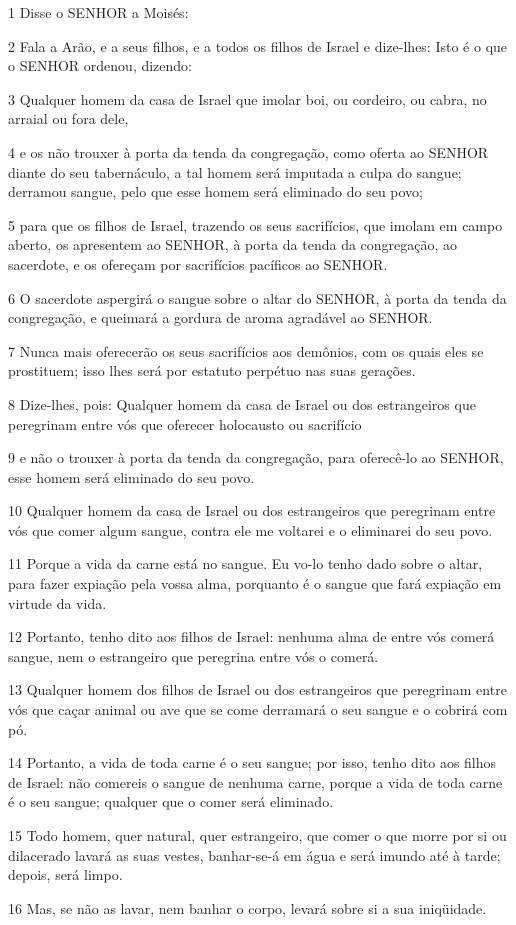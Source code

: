 \par 1 Disse o SENHOR a Moisés:
\par 2 Fala a Arão, e a seus filhos, e a todos os filhos de Israel e dize-lhes: Isto é o que o SENHOR ordenou, dizendo:
\par 3 Qualquer homem da casa de Israel que imolar boi, ou cordeiro, ou cabra, no arraial ou fora dele,
\par 4 e os não trouxer à porta da tenda da congregação, como oferta ao SENHOR diante do seu tabernáculo, a tal homem será imputada a culpa do sangue; derramou sangue, pelo que esse homem será eliminado do seu povo;
\par 5 para que os filhos de Israel, trazendo os seus sacrifícios, que imolam em campo aberto, os apresentem ao SENHOR, à porta da tenda da congregação, ao sacerdote, e os ofereçam por sacrifícios pacíficos ao SENHOR.
\par 6 O sacerdote aspergirá o sangue sobre o altar do SENHOR, à porta da tenda da congregação, e queimará a gordura de aroma agradável ao SENHOR.
\par 7 Nunca mais oferecerão os seus sacrifícios aos demônios, com os quais eles se prostituem; isso lhes será por estatuto perpétuo nas suas gerações.
\par 8 Dize-lhes, pois: Qualquer homem da casa de Israel ou dos estrangeiros que peregrinam entre vós que oferecer holocausto ou sacrifício
\par 9 e não o trouxer à porta da tenda da congregação, para oferecê-lo ao SENHOR, esse homem será eliminado do seu povo.
\par 10 Qualquer homem da casa de Israel ou dos estrangeiros que peregrinam entre vós que comer algum sangue, contra ele me voltarei e o eliminarei do seu povo.
\par 11 Porque a vida da carne está no sangue. Eu vo-lo tenho dado sobre o altar, para fazer expiação pela vossa alma, porquanto é o sangue que fará expiação em virtude da vida.
\par 12 Portanto, tenho dito aos filhos de Israel: nenhuma alma de entre vós comerá sangue, nem o estrangeiro que peregrina entre vós o comerá.
\par 13 Qualquer homem dos filhos de Israel ou dos estrangeiros que peregrinam entre vós que caçar animal ou ave que se come derramará o seu sangue e o cobrirá com pó.
\par 14 Portanto, a vida de toda carne é o seu sangue; por isso, tenho dito aos filhos de Israel: não comereis o sangue de nenhuma carne, porque a vida de toda carne é o seu sangue; qualquer que o comer será eliminado.
\par 15 Todo homem, quer natural, quer estrangeiro, que comer o que morre por si ou dilacerado lavará as suas vestes, banhar-se-á em água e será imundo até à tarde; depois, será limpo.
\par 16 Mas, se não as lavar, nem banhar o corpo, levará sobre si a sua iniqüidade.


